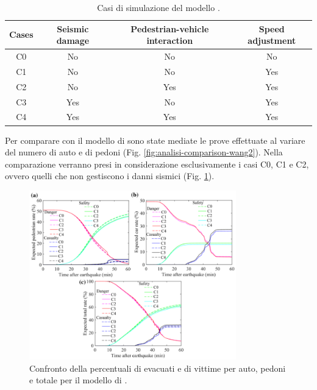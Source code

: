 \begin{table}[ht]
    \centering
    \begin{tabular}{|c|c|c|c|}
        \hline
        Cases & Seismic damage & Pedestrian-vehicle interaction & Speed adjustment \\ \hline
        C0    & No             & No                             & No               \\ \hline
        C1    & No             & No                             & Yes              \\ \hline
        C2    & No             & Yes                            & Yes              \\ \hline
        C3    & Yes            & No                             & Yes              \\ \hline
        C4    & Yes            & Yes                            & Yes              \\ \hline
    \end{tabular}
    \caption{Casi di simulazione del modello \textcite{wang2021novel}.}
    \label{tab:cases}
\end{table}

Per comparare con il modello di \textcite{wang2021novel} sono state mediate le prove effettuate al variare del numero
di auto e di pedoni (Fig. \ref{fig:analisi-comparison-wang2}).
Nella comparazione verranno presi in considerazione esclusivamente i casi C0, C1 e C2, ovvero quelli
che non gestiscono i danni sismici (Fig. \ref{fig:analisi-comparison-wang1}).

\begin{figure}[p]
    \centering
    \includegraphics[width=0.8\textwidth]{images/analisi/WANG_comparison1.png}
    \caption{Confronto della percentuali di evacuati e di vittime per auto, pedoni e totale per il modello di \textcite{wang2021novel}.}
    \label{fig:analisi-comparison-wang1}
\end{figure}

